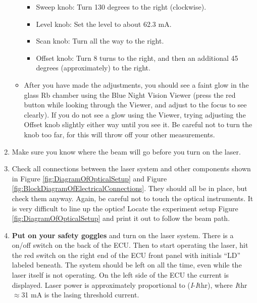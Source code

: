 \documentclass{../lab}
\begin{document}
\begin{enumerate}
\begin{itemize}
        \begin{itemize}
            \item Sweep knob: Turn 130 degrees to the right (clockwise).
    
            \item Level knob: Set the level to about 62.3 mA.
    
            \item Scan knob: Turn all the way to the right.
    
            \item Offset knob: Turn 8 turns to the right, and then an additional 45 degrees (approximately) to the right.
        \end{itemize}

        \item After you have made the adjustments, you should see a faint glow in the glass Rb chamber using the Blue Night Vision Viewer (press the red button while looking through the Viewer, and adjust to the focus to see clearly). If you do not see a glow using the Viewer, trying adjusting the Offset knob slightly either way until you see it. Be careful not to turn the knob too far, for this will throw off your other measurements.
    \end{itemize}
    
    \item Make sure you know where the beam will go before you turn on the laser.

    \item Check all connections between the laser system and other components shown in Figure \ref{fig:DiagramOfOpticalSetup} and Figure \ref{fig:BlockDiagramOfElectricalConnections}. They should all be in place, but check them anyway. Again, be careful not to touch the optical instruments. It is very difficult to line up the optics! Locate the experiment setup Figure \ref{fig:DiagramOfOpticalSetup} and print it out to follow the beam path.
    
    \item \textbf{Put on your safety goggles} and turn on the laser system. There is a on/off switch on the back of the ECU. Then to start operating the laser, hit the red switch on the right end of the ECU front panel with initials ``LD'' labeled beneath. The system should be left on all the time, even while the laser itself is not operating. On the left side of the ECU the current is displayed. Laser power is approximately proportional to (\emph{I}-\emph{I}thr), where \emph{I}thr$\approx$31 mA is the lasing threshold current.
    

\end{enumerate}
\end{document}
